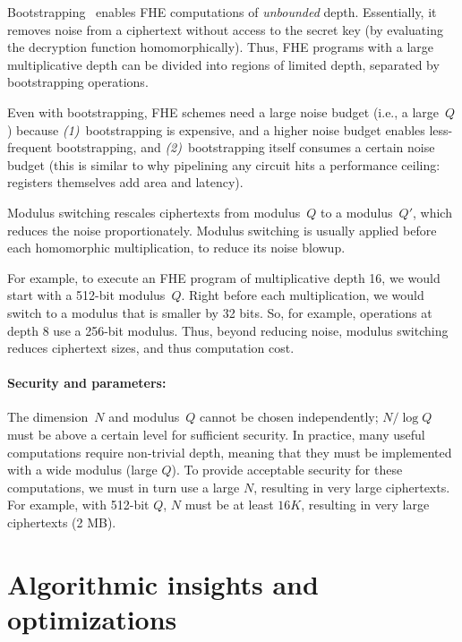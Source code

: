 Bootstrapping~\cite{gentry09} enables FHE computations of
\emph{unbounded} depth.  Essentially, it removes noise from a
ciphertext without access to the secret key (by evaluating the
decryption function homomorphically).  Thus, FHE programs with a large
multiplicative depth can be divided into regions of limited depth,
separated by bootstrapping operations.

Even with bootstrapping, FHE schemes need a large noise budget
(i.e., a large~$Q$) because \emph{(1)}~bootstrapping is expensive,
and a higher noise budget enables less-frequent bootstrapping, and
\emph{(2)}~bootstrapping itself consumes a certain noise budget
(this is similar to why pipelining any circuit hits a performance ceiling: registers themselves add area and latency).

Modulus switching rescales ciphertexts from modulus~$Q$ to a
modulus~$Q'$, which reduces the noise proportionately.
Modulus switching is usually applied before each homomorphic
multiplication, to reduce its noise blowup.

For example, to execute an FHE program of multiplicative depth 16, we
would start with a 512-bit modulus~$Q$.  Right before each multiplication, we
would switch to a modulus that is smaller by 32 bits. So, for example, operations at depth 8 use a 256-bit
modulus.  Thus, beyond reducing noise, modulus switching reduces
ciphertext sizes, and thus computation cost.

\paragraph{Security and parameters:}
The dimension~$N$ and modulus~$Q$ cannot be chosen independently;
$N/\log Q$ must be above a certain level for sufficient security.
In practice, many useful computations require non-trivial depth, meaning that they must be implemented with a wide modulus (large $Q$).
To provide acceptable security for these computations, we must in turn use a large $N$, resulting in very large ciphertexts. For example, with 512-bit $Q$, $N$ must be at least $16K$, resulting in very large ciphertexts (2 MB).

\section{Algorithmic insights and optimizations}
\label{sec:fhe_optimizations}

